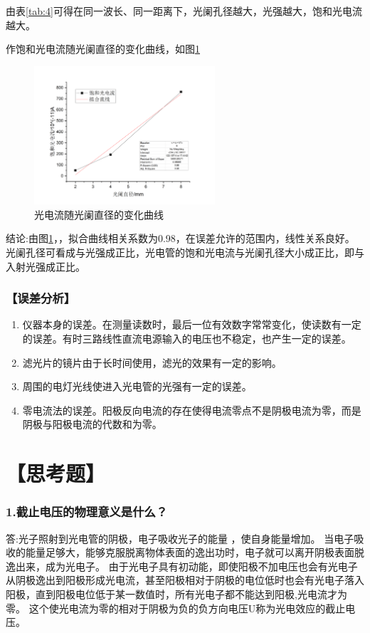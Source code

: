 \documentclass[12pt,a4paper,UTF8]{ctexart}
\begin{document}
由表\ref{tab:4}可得在同一波长、同一距离下，光阑孔径越大，光强越大，饱和光电流越大。

作饱和光电流随光阑直径的变化曲线，如图\ref{fig:5}
\begin{figure}[!h]
	\centering
	\includegraphics[width=0.6\textwidth]{img//reg4.png}
	\caption{光电流随光阑直径的变化曲线}
	\label{fig:5}
\end{figure}
结论:由图\ref{fig:5}，，拟合曲线相关系数为0.98，在误差允许的范围内，线性关系良好。
光阑孔径可看成与光强成正比，光电管的饱和光电流与光阑孔径大小成正比，即与入射光强成正比。

\subsubsection*{【误差分析】}
\begin{enumerate}
	\item 仪器本身的误差。在测量读数时，最后一位有效数字常常变化，使读数有一定的误差。有时三路线性直流电源输入的电压也不稳定，也产生一定的误差。
	\item 滤光片的镜片由于长时间使用，滤光的效果有一定的影响。
	\item 周围的电灯光线使进入光电管的光强有一定的误差。
	\item 零电流法的误差。阳极反向电流的存在使得电流零点不是阴极电流为零，而是阴极与阳极电流的代数和为零。
\end{enumerate}

\section*{【思考题】}
\subsubsection*{1.截止电压的物理意义是什么？}
答:光子照射到光电管的阴极，电子吸收光子的能量 ，使自身能量增加。
当电子吸收的能量足够大，能够克服脱离物体表面的逸出功时，电子就可以离开阴极表面脱逸出来，成为光电子。
由于光电子具有初动能，即使阳极不加电压也会有光电子从阴极逸出到阳极形成光电流，甚至阳极相对于阴极的电位低时也会有光电子落入阳极，直到阳极电位低于某一数值时，所有光电子都不能达到阳极,光电流才为零。
这个使光电流为零的相对于阴极为负的负方向电压U称为光电效应的截止电压。
\end{document}
